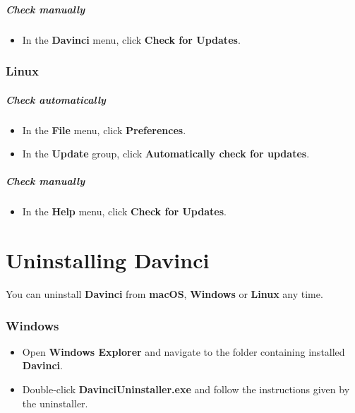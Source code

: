 \subparagraph{Check manually}

\begin{itemize}
	\item In the \textbf{Davinci} menu, click \textbf{Check for Updates}.
\end{itemize}

\subsubsection{Linux}

\subparagraph{Check automatically}

\begin{itemize}
	\item In the \textbf{File} menu, click \textbf{Preferences}.
	\item In the \textbf{Update} group, click \textbf{Automatically check for updates}.
\end{itemize}

\subparagraph{Check manually}

\begin{itemize}
	\item In the \textbf{Help} menu, click \textbf{Check for Updates}.
\end{itemize}

\section{Uninstalling Davinci}

You can uninstall \textbf{Davinci} from \textbf{macOS}, \textbf{Windows} or \textbf{Linux} any time.

\subsubsection{Windows}

\begin{itemize}
	\item Open \textbf{Windows Explorer} and navigate to the folder containing installed \textbf{Davinci}.
	\item Double-click \textbf{DavinciUninstaller.exe} and follow the instructions given by the uninstaller.
\end{itemize}

